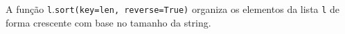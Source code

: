 \documentclass[12pt,varwidth=16cm,border=1pt]{standalone}
\begin{document}
A função \verb+l+.\verb+sort(key=len, reverse=True)+ organiza os elementos da lista \verb+l+ de forma crescente com base no tamanho da string.

\questiomtrue
\end{document}
